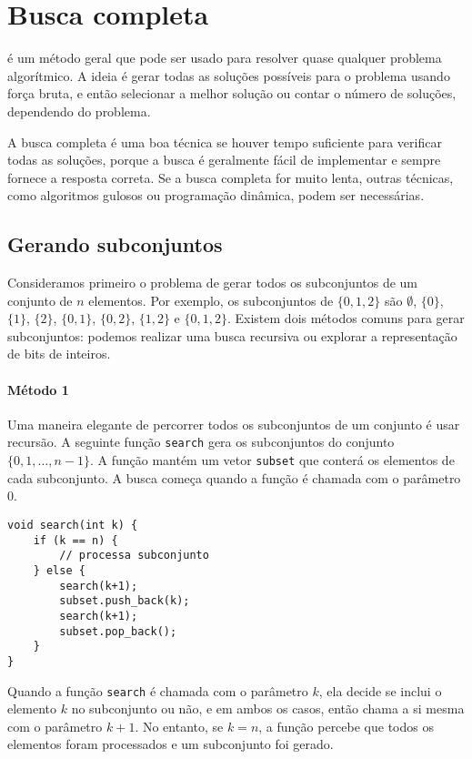 \chapter{Busca completa}

é um método geral que pode ser usado
para resolver quase qualquer problema algorítmico.
A ideia é gerar todas as soluções possíveis
para o problema usando força bruta,
e então selecionar a melhor solução ou contar o
número de soluções, dependendo do problema.

A busca completa é uma boa técnica
se houver tempo suficiente para verificar todas as soluções,
porque a busca é geralmente fácil de implementar
e sempre fornece a resposta correta.
Se a busca completa for muito lenta,
outras técnicas, como algoritmos gulosos ou
programação dinâmica, podem ser necessárias.

\section{Gerando subconjuntos}


Consideramos primeiro o problema de gerar
todos os subconjuntos de um conjunto de $n$ elementos.
Por exemplo, os subconjuntos de $\{0,1,2\}$ são
$\emptyset$, $\{0\}$, $\{1\}$, $\{2\}$, $\{0,1\}$,
$\{0,2\}$, $\{1,2\}$ e $\{0,1,2\}$.
Existem dois métodos comuns para gerar subconjuntos:
podemos realizar uma busca recursiva
ou explorar a representação de bits de inteiros.

\subsubsection{Método 1}

Uma maneira elegante de percorrer todos os subconjuntos
de um conjunto é usar recursão.
A seguinte função \texttt{search}
gera os subconjuntos do conjunto
$\{0,1,\ldots,n-1\}$.
A função mantém um vetor \texttt{subset}
que conterá os elementos de cada subconjunto.
A busca começa quando a função é chamada
com o parâmetro 0.

\begin{lstlisting}
void search(int k) {
    if (k == n) {
        // processa subconjunto
    } else {
        search(k+1);
        subset.push_back(k);
        search(k+1);
        subset.pop_back();
    }
}
\end{lstlisting}

Quando a função \texttt{search}
é chamada com o parâmetro $k$,
ela decide se inclui o
elemento $k$ no subconjunto ou não,
e em ambos os casos,
então chama a si mesma com o parâmetro $k+1$.
No entanto, se $k=n$, a função percebe que
todos os elementos foram processados
e um subconjunto foi gerado.

